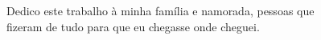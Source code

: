 \begin{dedicatoria}
   \vspace*{\fill}
   	\begin{flushright}
   \noindent
    Dedico este trabalho à minha família e namorada, pessoas que \\fizeram de tudo para que eu chegasse onde cheguei.
   	\end{flushright}
\end{dedicatoria}
